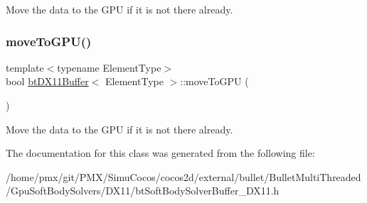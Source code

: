 Move the data to the G\+PU if it is not there already. \mbox{\label{classbtDX11Buffer_a6d374469254cb3c03d6e18d03ca8a23c}} 
\subsubsection{\texorpdfstring{move\+To\+G\+P\+U()}{moveToGPU()}\hspace{0.1cm}{\footnotesize\ttfamily [2/2]}}
{\footnotesize\ttfamily template$<$typename Element\+Type$>$ \\
bool \hyperlink{classbtDX11Buffer}{bt\+D\+X11\+Buffer}$<$ Element\+Type $>$\+::move\+To\+G\+PU (\begin{DoxyParamCaption}{ }\end{DoxyParamCaption})\hspace{0.3cm}{\ttfamily [inline]}}

Move the data to the G\+PU if it is not there already. 

The documentation for this class was generated from the following file\+:\begin{DoxyCompactItemize}
\item 
/home/pmx/git/\+P\+M\+X/\+Simu\+Cocos/cocos2d/external/bullet/\+Bullet\+Multi\+Threaded/\+Gpu\+Soft\+Body\+Solvers/\+D\+X11/bt\+Soft\+Body\+Solver\+Buffer\+\_\+\+D\+X11.\+h\end{DoxyCompactItemize}
